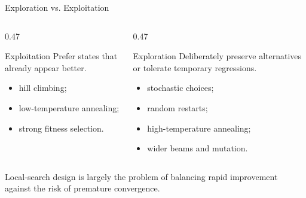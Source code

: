 \documentclass[aspectratio=169,10pt]{beamer}
\begin{document}
\begin{frame}[shrink=20]{Exploration vs. Exploitation}
  \begin{columns}[T,onlytextwidth]
    \begin{column}{0.47\textwidth}
      \begin{block}{Exploitation}
        Prefer states that already appear better.
        \begin{itemize}
          \item hill climbing;
          \item low-temperature annealing;
          \item strong fitness selection.
        \end{itemize}
      \end{block}
    \end{column}

    \begin{column}{0.47\textwidth}
      \begin{block}{Exploration}
        Deliberately preserve alternatives or tolerate temporary regressions.
        \begin{itemize}
          \item stochastic choices;
          \item random restarts;
          \item high-temperature annealing;
          \item wider beams and mutation.
        \end{itemize}
      \end{block}
    \end{column}
  \end{columns}

  \begin{keyidea}
    Local-search design is largely the problem of balancing rapid improvement against the risk of premature convergence.
  \end{keyidea}
\end{frame}
\end{document}
